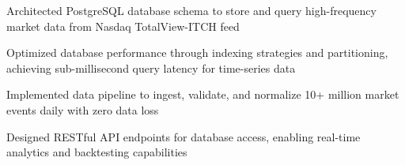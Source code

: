 \item Architected PostgreSQL database schema to store and query high-frequency market data from Nasdaq TotalView-ITCH feed
\item Optimized database performance through indexing strategies and partitioning, achieving sub-millisecond query latency for time-series data
\item Implemented data pipeline to ingest, validate, and normalize 10+ million market events daily with zero data loss
\item Designed RESTful API endpoints for database access, enabling real-time analytics and backtesting capabilities
